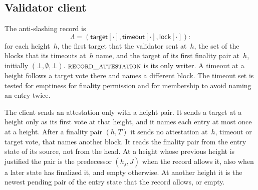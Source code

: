 \subsection{Validator client}\label{sec:fg-client}

The anti-slashing record is
\[
 \Lambda=(\mathsf{target}[\cdot],\mathsf{timeout}[\cdot],
 \mathsf{lock}[\cdot]):
\]
for each height~$h$, the first target that the validator sent at~$h$,
the set of the blocks that its timeouts at~$h$ name, and the target of
its first finality pair at~$h$, initially $(\bot,\emptyset,\bot)$.
$\Call{record\_attestation}{}$ is its only writer. A timeout at a height
follows a target vote there and names a different block. The timeout set
is tested for emptiness for finality permission and for membership to
avoid naming an entry twice.

The client sends an attestation only with a height pair.  It sends a
target at a height only as its first vote at that height, and it names
each entry at most once at a height.  After a finality pair $(h,T)$ it
sends no attestation at~$h$, timeout or target vote, that names another block.
It reads the finality pair from the entry state of its source, not from
the head.  At a height whose previous height is justified the
pair is the predecessor $(h_j,J)$ when the record allows it, also when a
later state has finalized it, and empty otherwise.  At another height it
is the newest pending pair of the entry state that the record allows, or
empty.

